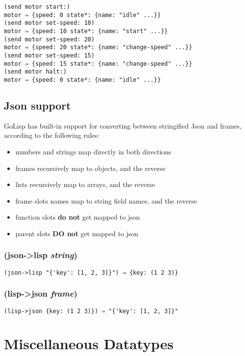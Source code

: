 \documentclass{article}
\begin{document}
\begin{verbatim}
(send motor start:)
motor ⇒ {speed: 0 state*: {name: "idle" ...}}
(send motor set-speed: 10)
motor ⇒ {speed: 10 state*: {name: "start" ...}}
(send motor set-speed: 20)
motor ⇒ {speed: 20 state*: {name: "change-speed" ...}}
(send motor set-speed: 15)
motor ⇒ {speed: 15 state*: {name: "change-speed" ...}}
(send motor halt:)
motor ⇒ {speed: 0 state*: {name: "idle" ...}}
\end{verbatim}

\subsection{Json support}\label{sec:json-support}

GoLisp has built-in support for converting between stringified Json and frames, according to
the following rules:

\begin{itemize}
\item numbers and strings map directly in both directions
\item frames recursively map to objects, and the reverse
\item lists recursively map to arrays, and the reverse
\item frame slots names map to string field names, and the reverse
\item function slots \textbf{do not} get mapped to json
\item parent slots \textbf{DO not} get mapped to json
\end{itemize}

\subsubsection{(json-\textgreater{}lisp \emph{string})}

\begin{verbatim}
(json->lisp "{'key': [1, 2, 3]}") ⇒ {key: (1 2 3)}
\end{verbatim}

\subsubsection{(lisp-\textgreater{}json \emph{frame})}

\begin{verbatim}
(lisp->json {key: (1 2 3)}) ⇒ "{'key': [1, 2, 3]}"
\end{verbatim}

\section{Miscellaneous Datatypes}\label{sec:miscellaneous-datatypes}
\end{document}
